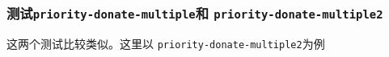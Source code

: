 \documentclass{beamer}
\begin{document}
\begin{frame}
  \frametitle{测试\texttt{priority-donate-multiple}和 \texttt{priority-donate-multiple2}}
  这两个测试比较类似。这里以 \texttt{priority-donate-multiple2}为例
















\end{frame}
\end{document}
